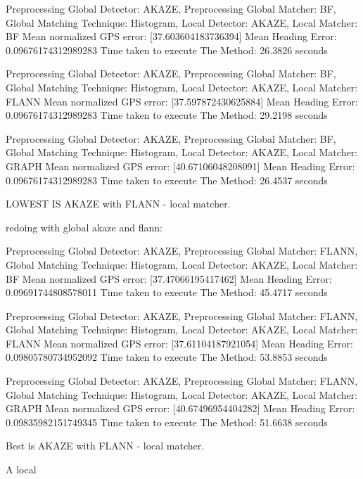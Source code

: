 Preprocessing Global Detector: AKAZE, Preprocessing Global Matcher: BF, Global Matching Technique: Histogram, Local Detector: AKAZE, Local Matcher: BF
Mean normalized GPS error: [37.603604183736394]
Mean Heading Error: 0.09676174312989283
Time taken to execute The Method: 26.3826 seconds

Preprocessing Global Detector: AKAZE, Preprocessing Global Matcher: BF, Global Matching Technique: Histogram, Local Detector: AKAZE, Local Matcher: FLANN
Mean normalized GPS error: [37.597872430625884]
Mean Heading Error: 0.09676174312989283
Time taken to execute The Method: 29.2198 seconds


Preprocessing Global Detector: AKAZE, Preprocessing Global Matcher: BF, Global Matching Technique: Histogram, Local Detector: AKAZE, Local Matcher: GRAPH
Mean normalized GPS error: [40.67106048208091]
Mean Heading Error: 0.09676174312989283
Time taken to execute The Method: 26.4537 seconds

LOWEST IS AKAZE with FLANN - local matcher. 

redoing with global akaze and flann:

Preprocessing Global Detector: AKAZE, Preprocessing Global Matcher: FLANN, Global Matching Technique: Histogram, Local Detector: AKAZE, Local Matcher: BF
Mean normalized GPS error: [37.47066195417462]
Mean Heading Error: 0.09691744808578011
Time taken to execute The Method: 45.4717 seconds


Preprocessing Global Detector: AKAZE, Preprocessing Global Matcher: FLANN, Global Matching Technique: Histogram, Local Detector: AKAZE, Local Matcher: FLANN
Mean normalized GPS error: [37.61104187921054]
Mean Heading Error: 0.09805780734952092
Time taken to execute The Method: 53.8853 seconds



Preprocessing Global Detector: AKAZE, Preprocessing Global Matcher: FLANN, Global Matching Technique: Histogram, Local Detector: AKAZE, Local Matcher: GRAPH
Mean normalized GPS error: [40.67496954404282]
Mean Heading Error: 0.09835982151749345
Time taken to execute The Method: 51.6638 seconds

Best is AKAZE with FLANN - local matcher.


A local 